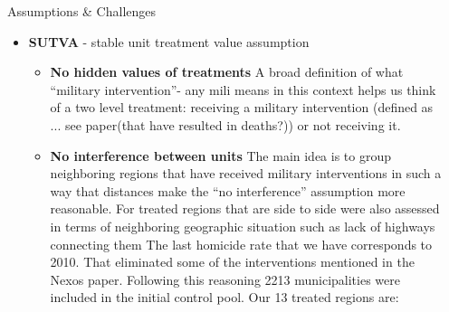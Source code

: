 \documentclass[final]{beamer}
\newlength{\sepwid}
\newlength{\onecolwid}
\newlength{\threecolwid}
\begin{document}
\begin{frame}[t]
\begin{columns}[t]
\begin{column}{\onecolwid}
      \vskip2ex

    \end{column}

    \begin{column}{\sepwid}\end{column}			%
    \begin{column}{\threecolwid}					  %
		\begin{block}{Assumptions \& Challenges}
			\begin{itemize}
			\item \textbf{SUTVA} - stable unit treatment value assumption
			\begin{itemize}
				\item \textbf{No hidden values of treatments} A broad definition of what ``military intervention''- any mili means in this context helps us think of a two level treatment: receiving a military intervention (defined as ... see paper(that have resulted in deaths?)) or not receiving it.
				\item \textbf{No interference between units} The main idea is to group neighboring regions that have received military interventions in such a way that distances make the ``no interference'' assumption  more reasonable. For treated regions that are side to side were also assessed in terms of neighboring  geographic situation such as lack of highways connecting them %
		The last homicide rate that we have corresponds to 2010. That eliminated some of the interventions mentioned in the Nexos paper. 
		Following this reasoning 2213 municipalities were included in the initial control pool. Our 13 treated regions are:
		
	
		

\end{itemize}
\end{itemize}
\end{block}
\end{column}
\end{columns}
\end{frame}
\end{document}
